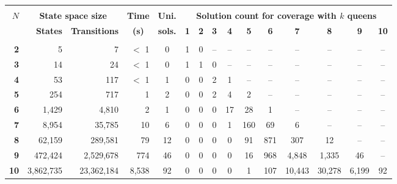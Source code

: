 \begin{tabular}{@{ }r|r@{\enspace}r|r|c|c@{\quad}c@{\quad}c@{\quad\!}c@{\quad\!\!}c@{\quad\!}c@{\quad\!}c@{\quad\!}c@{\quad\!}c@{\quad\!}c@{ }}
\hline
& & & & \\[-3mm]
\multirow{2}{*}{$N$} & \multicolumn{2}{|c|}{\bf State space size} &
\multicolumn{1}{|c|}{\bf Time} & \bf Uni. & \multicolumn{10}{|c}{\bf
Solution count for coverage with $k$ queens}\\
& \bf States & \bf Transitions & \multicolumn{1}{|c|}{\bf (s)} & \bf
sols. & \bf 1 & \bf 2 & \bf 3 & \bf 4 & \bf 5 & \bf 6 & \bf 7 & \bf 8 & \bf
9 & \bf 10\\
\hline
& & & & \\[-2mm]
\bf 2  &         5 &          7 & $<$ 1 &  0 & 1 & 0 & -- & -- & -- & -- & -- & -- & -- & --\\
\bf 3  &        14 &         24 & $<$ 1 &  0 & 1 & 1 & 0 & -- & -- & -- & -- & -- & -- & --\\
\bf 4  &        53 &        117 & $<$ 1 &  1 & 0 & 0 & 2 & 1 & -- & -- & -- & -- & -- & --\\
\bf 5  &       254 &        717 &     1 &  2 & 0 & 0 & 2 & 4 & 2 & -- & -- & -- & -- & --\\
\bf 6  &     1,429 &      4,810 &     2 &  1 & 0 & 0 & 0 & 17 & 28 & 1 & -- & -- & -- & --\\
\bf 7  &     8,954 &     35,785 &    10 &  6 & 0 & 0 & 0 & 1 & 160 & 69 & 6 & -- & -- & --\\
\bf 8  &    62,159 &    289,581 &    79 & 12 & 0 & 0 & 0 & 0 & 91 & 871 & 307 & 12 & -- & --\\
\bf 9  &   472,424 &  2,529,678 &   774 & 46 & 0 & 0 & 0 & 0 & 16 & 968 & 4,848 & 1,335 & 46 & --\\
\bf 10 & 3,862,735 & 23,362,184 & 8,538 & 92 & 0 & 0 & 0 & 0 & 1 & 107 & 10,443 & 30,278 & 6,199 & 92\\
\hline
\end{tabular}

